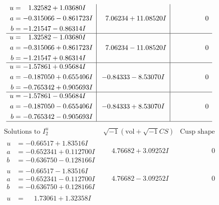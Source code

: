 \documentclass[1p]{elsarticle_modified}
\theoremstyle{definition}
\newcommand{\I}{\sqrt{-1}}
\begin{document}
$$\begin{array}{c|c|c}
\begin{aligned}
u &= \phantom{-}1.32582 + 1.03680 I \\
a &= -0.315066 - 0.861723 I \\
b &= -1.21547 - 0.86314 I\end{aligned}
 & \phantom{-}7.06234 + 11.08520 I & \phantom{-0.000000 } 0 \\ \hline\begin{aligned}
u &= \phantom{-}1.32582 - 1.03680 I \\
a &= -0.315066 + 0.861723 I \\
b &= -1.21547 + 0.86314 I\end{aligned}
 & \phantom{-}7.06234 - 11.08520 I & \phantom{-0.000000 } 0 \\ \hline\begin{aligned}
u &= -1.57861 + 0.95684 I \\
a &= -0.187050 + 0.655406 I \\
b &= -0.765342 + 0.905693 I\end{aligned}
 & -0.84333 - 8.53070 I & \phantom{-0.000000 } 0 \\ \hline\begin{aligned}
u &= -1.57861 - 0.95684 I \\
a &= -0.187050 - 0.655406 I \\
b &= -0.765342 - 0.905693 I\end{aligned}
 & -0.84333 + 8.53070 I & \phantom{-0.000000 } 0\\
 \hline 
 \end{array}$$\newpage$$\begin{array}{c|c|c}  
\text{Solutions to }I^u_{2}& \I (\text{vol} + \sqrt{-1}CS) & \text{Cusp shape}\\
 \hline 
\begin{aligned}
u &= -0.66517 + 1.83516 I \\
a &= -0.652341 + 0.112700 I \\
b &= -0.636750 - 0.128166 I\end{aligned}
 & \phantom{-}4.76682 + 3.09252 I & \phantom{-0.000000 } 0 \\ \hline\begin{aligned}
u &= -0.66517 - 1.83516 I \\
a &= -0.652341 - 0.112700 I \\
b &= -0.636750 + 0.128166 I\end{aligned}
 & \phantom{-}4.76682 - 3.09252 I & \phantom{-0.000000 } 0 \\ \hline\begin{aligned}
u &= \phantom{-}1.73061 + 1.32358 I \\

\end{aligned}
\end{array}$$
\end{document}
